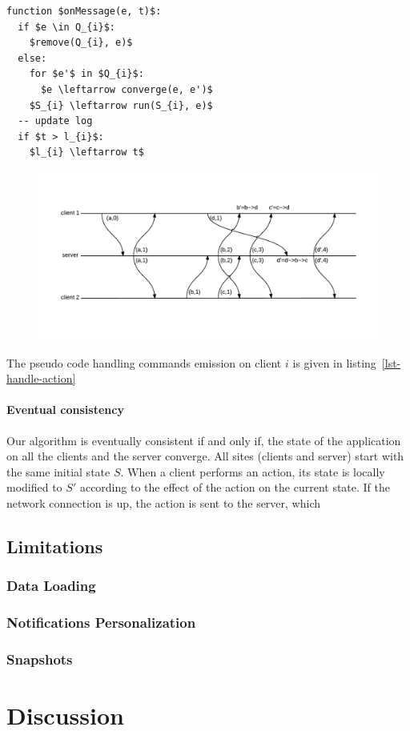 \documentclass{acm_proc_article-sp}
\begin{document}
\begin{lstlisting}[mathescape]
function $onMessage(e, t)$:
  if $e \in Q_{i}$:
    $remove(Q_{i}, e)$
  else:
    for $e'$ in $Q_{i}$:
      $e \leftarrow converge(e, e')$
    $S_{i} \leftarrow run(S_{i}, e)$
  -- update log
  if $t > l_{i}$:
    $l_{i} \leftarrow t$
\end{lstlisting}

\begin{figure}
\centering
\includegraphics[width=14cm]{causality.pdf}
\end{figure}

The pseudo code handling commands emission on client $i$ is given in listing~\ref{lst-handle-action}

\paragraph{Eventual consistency} Our algorithm is eventually consistent if and only if, the state of the application on all the clients and the server converge. All sites (clients and server) start with the same initial state $S$. When a client performs an action, its state is locally modified to $S'$ according to the effect of the action on the current state. If the network connection is up, the action is sent to the server, which 

\subsection{Limitations}

\subsubsection{Data Loading}

\subsubsection{Notifications Personalization}

\subsubsection{Snapshots}

\section{Discussion}

\balancecolumns
\end{document}
